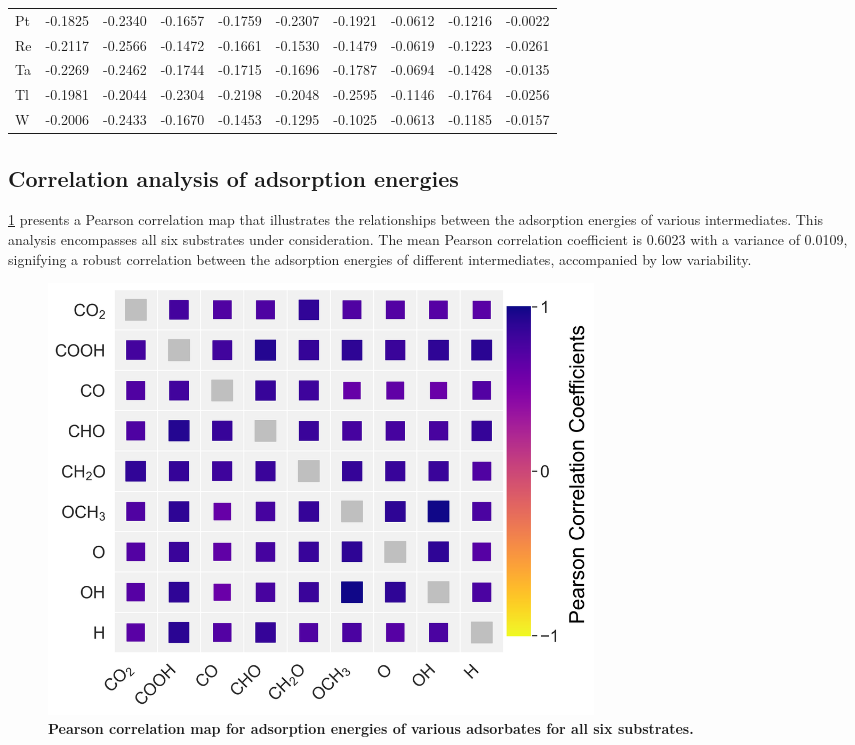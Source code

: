 \begin{table}[htbp]
{\begin{tabular}{l *{9}{l}}
        Pt & -0.1825 & -0.2340 & -0.1657 & -0.1759 & -0.2307 & -0.1921 & -0.0612 & -0.1216 & -0.0022 \\
        Re & -0.2117 & -0.2566 & -0.1472 & -0.1661 & -0.1530 & -0.1479 & -0.0619 & -0.1223 & -0.0261 \\
        Ta & -0.2269 & -0.2462 & -0.1744 & -0.1715 & -0.1696 & -0.1787 & -0.0694 & -0.1428 & -0.0135 \\
        Tl & -0.1981 & -0.2044 & -0.2304 & -0.2198 & -0.2048 & -0.2595 & -0.1146 & -0.1764 & -0.0256 \\
        W  & -0.2006 & -0.2433 & -0.1670 & -0.1453 & -0.1295 & -0.1025 & -0.0613 & -0.1185 & -0.0157 \\
        \bottomrule
    \end{tabular}
  }
\end{table}

\subsection{Correlation analysis of adsorption energies}
\label{supp_sec2.4_corr_analysis}

\cref{supp_fig9:corr_eads} presents a Pearson correlation map that illustrates the relationships between the adsorption energies of various intermediates. This analysis encompasses all six substrates under consideration. The mean Pearson correlation coefficient is 0.6023 with a variance of 0.0109, signifying a robust correlation between the adsorption energies of different intermediates, accompanied by low variability.

\begin{figure}[htbp]
  \centering
  \includegraphics[width=0.7\textwidth]{supp_fig9_corr_eads.png}
  \caption{\textbf{Pearson correlation map for adsorption energies of various adsorbates for all six substrates.}}
  \label{supp_fig9:corr_eads}
\end{figure}

